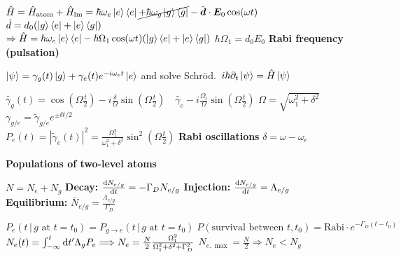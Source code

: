 \begin{squishlist}
    \item $\ham = \ham_{\text{atom}} + \ham_{\text{lm}} = \hbar \omega_e \ket{e}\bra{e} \cancel{+ \hbar \omega_g \ket{g}\bra{g}} - \hat{\vec{d}}\cdot \vec{E}_0 \cos(\omega t)$ \quad $\hat{d} = d_0 (\ket{g}\bra{e} + \ket{e}\bra{g})$ \\
    $\Rightarrow \ham = \hbar \omega_e \ket{e}\bra{e} - \hbar \Omega_1 \cos(\omega t)(\ket{g}\bra{e} + \ket{e}\bra{g})$ \quad $\hbar \Omega_1 = d_0 E_0$ \textbf{Rabi frequency (pulsation)}
    \item $\kpsi = \gamma_g(t)\ket{g} + \gamma_e(t)e^{-i\omega_e t} \ket{e}$ and solve Schröd.\ $i\hbar \partial_t \kpsi = \ham \kpsi$
    \item $\tilde{\gamma_g}(t) = \cos(\Omega \frac{t}{2}) - i \frac{\delta}{\Omega} \sin( \Omega \frac{t}{2}) \quad \tilde{\gamma_e}- i \frac{\Omega_i}{\Omega} \sin( \Omega \frac{t}{2})$ \qquad $\Omega = \sqrt{\omega_1^2 + \delta^2}$ \quad $\gamma_{g/e} = \tilde{\gamma}_{g/e}e^{\pm \delta t / 2}$ \\
    $P_e(t) = |\tilde{\gamma}_e(t)|^2 = \frac{\Omega_1^2}{\omega_1^2 + \delta^2} \sin^2(\Omega \frac{t}{2})$ \quad \textbf{Rabi oscillations} \qquad $\delta = \omega - \omega_e$

    \squishline

    \textbf{Populations of two-level atoms}
    \item $N = N_e + N_g$ \quad \textbf{Decay:} $\der{t}{N_{e/g}} = - \Gamma_D N_{e/g}$ \quad \textbf{Injection:} $\der{t}{N_{e/g}} = \Lambda_{e/g}$ \\
    \textbf{Equilibrium:} $\bar{N}_{e/g} = \frac{\Lambda_{e/g}}{\Gamma_D}$
    \item $P_e(t \,| \,g \text{ at } t=t_0) = P_{g\rightarrow e}(t\, |\, g \text{ at } t=t_0) \; P(\text{survival between } t,t_0) = \text{Rabi} \cdot e^{-\Gamma_D (t-t_0)}$ \\
    $N_e(t) = \int_{-\infty}^{t} \ud t' \Lambda_g P_e \Longrightarrow N_e = \frac{N}{2} \frac{\Omega_1^2}{\Omega_1^2 + \delta^2 + \Gamma_D^2}$ \qquad $N_{e,\max} = \frac{N}{2} \Longrightarrow N_e < N_g$

    \squishline 


\end{squishlist}
